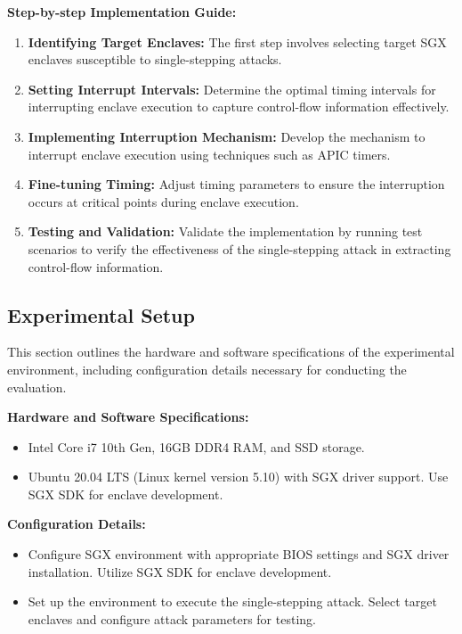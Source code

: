 \documentclass{llncs}
\begin{document}
\textbf{Step-by-step Implementation Guide:}
\begin{enumerate}
  \item \textbf{Identifying Target Enclaves:} The first step involves selecting target SGX enclaves susceptible to single-stepping attacks.
  \item \textbf{Setting Interrupt Intervals:} Determine the optimal timing intervals for interrupting enclave execution to capture control-flow information effectively.
  \item \textbf{Implementing Interruption Mechanism:} Develop the mechanism to interrupt enclave execution using techniques such as APIC timers.
  \item \textbf{Fine-tuning Timing:} Adjust timing parameters to ensure the interruption occurs at critical points during enclave execution.
  \item \textbf{Testing and Validation:} Validate the implementation by running test scenarios to verify the effectiveness of the single-stepping attack in extracting control-flow information.
\end{enumerate}

\subsection{Experimental Setup}

This section outlines the hardware and software specifications of the experimental environment, including configuration details necessary for conducting the evaluation.

\textbf{Hardware and Software Specifications:}
\begin{itemize}
  \item Intel Core i7 10th Gen, 16GB DDR4 RAM, and SSD storage.
  \item Ubuntu 20.04 LTS (Linux kernel version 5.10) with SGX driver support. Use SGX SDK for enclave development.
\end{itemize}

\textbf{Configuration Details:}
\begin{itemize}
  \item Configure SGX environment with appropriate BIOS settings and SGX driver installation. Utilize SGX SDK for enclave development.
  \item Set up the environment to execute the single-stepping attack. Select target enclaves and configure attack parameters for testing.
\end{itemize}
\end{document}

